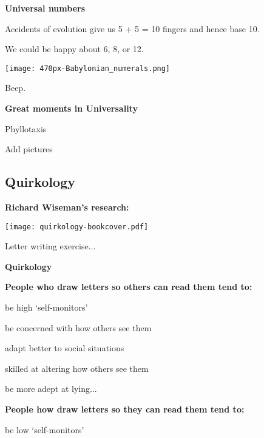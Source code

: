   \textbf{Universal numbers}

      
    
    
     
      Accidents of evolution give us 5 + 5 = 10 fingers
      and hence base 10.
    
      We could be happy about 6, 8, or 12.
    
    


  


      
    \texttt{[image: 470px-Babylonian\_numerals.png]}
    
    
    
      Beep.
    
  
  \textbf{Great moments in Universality}

  Phyllotaxis

  Add pictures


\subsection{Quirkology}

  \textbf{Richard Wiseman's research:}
  
      
    \texttt{[image: quirkology-bookcover.pdf]}\\
    
    
     
     
      Letter writing exercise...
    
    

  \textbf{Quirkology}

  \textbf{People who draw letters so others can read them tend to:}
    
     
      be high `self-monitors'
     
      be concerned with how others see them
     
      adapt better to social situations
     
      skilled at altering how others see them
     
      be more adept at lying...
        
  

  \textbf{People how draw letters so they can read them tend to:}
    
    
      be low `self-monitors'
    
